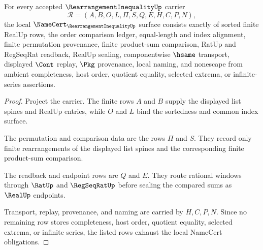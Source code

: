 \begin{theorem}
\label{thm:rearrangement-inequality-namecert-obligations}
For every accepted $\RearrangementInequalityUp$ carrier
$$
\mathcal{R}=(A,B,O,L,\Pi,S,Q,E,H,C,P,N),
$$
the local $\NameCert_{\RearrangementInequalityUp}$ surface consists exactly of sorted finite RealUp rows, the order comparison ledger, equal-length and index alignment, finite permutation provenance, finite product-sum comparison, RatUp and RegSeqRat readback, RealUp sealing, componentwise $\hsame$ transport, displayed $\Cont$ replay, $\Pkg$ provenance, local naming, and nonescape from ambient completeness, host order, quotient equality, selected extrema, or infinite-series assertions.
\end{theorem}
\begin{proof}
Project the carrier. The finite rows $A$ and $B$ supply the displayed list spines and RealUp entries, while $O$ and $L$ bind the sortedness and common index surface.

The permutation and comparison data are the rows $\Pi$ and $S$. They record only finite rearrangements of the displayed list spines and the corresponding finite product-sum comparison.

The readback and endpoint rows are $Q$ and $E$. They route rational windows through $\RatUp$ and $\RegSeqRatUp$ before sealing the compared sums as $\RealUp$ endpoints.

Transport, replay, provenance, and naming are carried by $H,C,P,N$. Since no remaining row stores completeness, host order, quotient equality, selected extrema, or infinite series, the listed rows exhaust the local NameCert obligations.
\end{proof}


